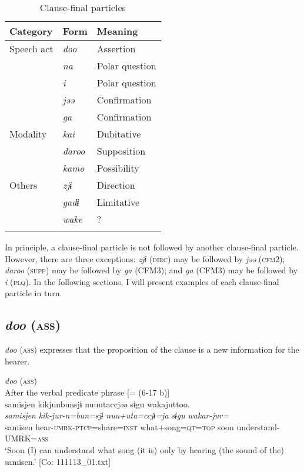 \begin{table}
\caption{Clause-final particles\label{tab:99}}
\begin{tabular}{lll}
\lsptoprule
Category & Form & Meaning\\\midrule
Speech act & \textit{doo} &  Assertion\\
           & \textit{na}  &  Polar question\\
           & \textit{i}   &  Polar question\\
           & \textit{jəə} &  Confirmation\\
           & \textit{ga}  &  Confirmation\\
Modality   & \textit{kai} &  Dubitative\\
           & \textit{daroo} & Supposition\\
           & \textit{kamo}  & Possibility\\
Others     & \textit{zjɨ}   & Direction\\
           & \textit{gadɨ}  & Limitative\\
           & \textit{wake}  & ?\\\lspbottomrule
\end{tabular}
\end{table}

In principle, a clause-final particle is not followed by another clause-final particle. However, there are three exceptions: \textit{zjɨ} (\textsc{dirc}) may be followed by \textit{jəə} (\textsc{cfm}2); \textit{daroo} (\textsc{supp}) may be followed by \textit{ga} (CFM3); and \textit{ga} (CFM3) may be followed by \textit{i} (\textsc{plq}). In the following sections, I will present examples of each clause-final particle in turn.

\subsection{\textit{doo} (\textsc{ass})}\label{sec:10.3.1}

\textit{doo} (\textsc{ass}) expresses that the proposition of the clause is a new information for the hearer.

\ea\label{ex:10.40}   \textit{doo} (\textsc{ass})\\
  \ea After the verbal predicate phrase [= (6-17 b)]\\
      \glll    samisjen  kikjunbunsjɨ  nuuutaccjəə  sɨgu  wakajuttoo.\\
    \textit{samisjen}  \textit{kik-jur-n=bun=sjɨ}  \textit{nuu+uta=ccjɨ=ja}  \textit{sɨgu}  \textit{wakar-jur=}\\
    samisen  hear-\textsc{umrk}-\textsc{ptcp}=share=\textsc{inst}  what+song=\textsc{qt}=\textsc{top}  soon  understand-UMRK=\textsc{ass}\\
\glt     ‘Soon (I) can understand what song (it is) only by hearing (the sound of the) samisen.’  [Co: 111113\_01.txt]

